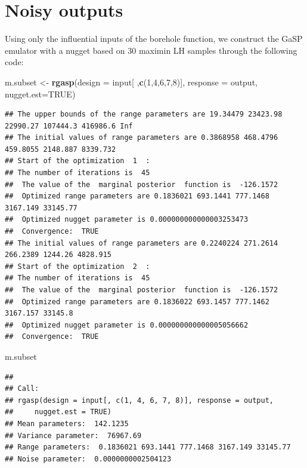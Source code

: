 \documentclass[
  10pt,
]{article}
\newenvironment{Shaded}{\begin{snugshade}}{\end{snugshade}}
\newcommand{\AttributeTok}[1]{\textcolor[rgb]{0.13,0.29,0.53}{#1}}
\newcommand{\ConstantTok}[1]{\textcolor[rgb]{0.56,0.35,0.01}{#1}}
\newcommand{\DecValTok}[1]{\textcolor[rgb]{0.00,0.00,0.81}{#1}}
\newcommand{\FunctionTok}[1]{\textcolor[rgb]{0.13,0.29,0.53}{\textbf{#1}}}
\newcommand{\NormalTok}[1]{#1}
\newcommand{\OtherTok}[1]{\textcolor[rgb]{0.56,0.35,0.01}{#1}}
\begin{document}
\section{Noisy outputs}\label{noisy-outputs}

Using only the influential inputs of the borehole function, we construct
the GaSP emulator with a nugget based on 30 maximin LH samples through
the following code:

\begin{Shaded}
\begin{Highlighting}[]
\NormalTok{m.subset }\OtherTok{\textless{}{-}} \FunctionTok{rgasp}\NormalTok{(}\AttributeTok{design =}\NormalTok{ input[ ,}\FunctionTok{c}\NormalTok{(}\DecValTok{1}\NormalTok{,}\DecValTok{4}\NormalTok{,}\DecValTok{6}\NormalTok{,}\DecValTok{7}\NormalTok{,}\DecValTok{8}\NormalTok{)], }\AttributeTok{response =}\NormalTok{ output,}
                  \AttributeTok{nugget.est=}\ConstantTok{TRUE}\NormalTok{)}
\end{Highlighting}
\end{Shaded}

\begin{verbatim}
## The upper bounds of the range parameters are 19.34479 23423.98 22990.27 107444.3 416986.6 Inf 
## The initial values of range parameters are 0.3868958 468.4796 459.8055 2148.887 8339.732 
## Start of the optimization  1  : 
## The number of iterations is  45 
##  The value of the  marginal posterior  function is  -126.1572 
##  Optimized range parameters are 0.1836021 693.1441 777.1468 3167.149 33145.77 
##  Optimized nugget parameter is 0.000000000000003253473 
##  Convergence:  TRUE 
## The initial values of range parameters are 0.2240224 271.2614 266.2389 1244.26 4828.915 
## Start of the optimization  2  : 
## The number of iterations is  45 
##  The value of the  marginal posterior  function is  -126.1572 
##  Optimized range parameters are 0.1836022 693.1457 777.1462 3167.157 33145.8 
##  Optimized nugget parameter is 0.000000000000005056662 
##  Convergence:  TRUE
\end{verbatim}

\begin{Shaded}
\begin{Highlighting}[]
\NormalTok{m.subset}
\end{Highlighting}
\end{Shaded}

\begin{verbatim}
## 
## Call:
## rgasp(design = input[, c(1, 4, 6, 7, 8)], response = output, 
##     nugget.est = TRUE)
## Mean parameters:  142.1235 
## Variance parameter:  76967.69 
## Range parameters:  0.1836021 693.1441 777.1468 3167.149 33145.77 
## Noise parameter:  0.0000000002504123
\end{verbatim}
\end{document}
